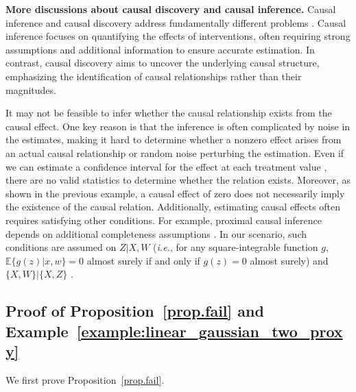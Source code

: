 \documentclass[
  12pt]{article}
\def\mE{\mathbb{E}}
\def\mE{\mathbb{E}}
\begin{document}
\textbf{More discussions about causal discovery and causal inference.} Causal inference and causal discovery address fundamentally different problems \citep{guo2020survey}. Causal inference focuses on quantifying the effects of interventions, often requiring strong assumptions and additional information to ensure accurate estimation. In contrast, causal discovery aims to uncover the underlying causal structure, emphasizing the identification of causal relationships rather than their magnitudes. 

It may not be feasible to infer whether the causal relationship exists from the causal effect. One key reason is that the inference is often complicated by noise in the estimates, making it hard to determine whether a nonzero effect arises from an actual causal relationship or random noise perturbing the estimation. Even if we can estimate a confidence interval for the effect at each treatment value \citep{robins1988confidence,robins2003uniform,calonico2018effect,colangelo2020double}, there are no valid statistics to determine whether the relation exists. Moreover, as shown in the previous example, a causal effect of zero does not necessarily imply the existence of the causal relation. Additionally, estimating causal effects often requires satisfying other conditions. For example, proximal causal inference depends on additional completeness assumptions \citep{miao2018identifying, mastouri2021proximal}. In our scenario, such conditions are assumed on $Z|X,W$ (\emph{i.e.}, for any square-integrable function $g$, $\mE\{g(z)|x,w\} = 0$ almost surely if and only if $g(z) = 0$ almost surely) and $\{X,W\}|\{X,Z\}$ \citep{mastouri2021proximal}. 



\subsection{Proof of Proposition~\ref{prop.fail} and Example~\ref{example:linear_gaussian_two_proxy}}
\label{appx.two_fail}

We first prove Proposition~\ref{prop.fail}. 
\end{document}
